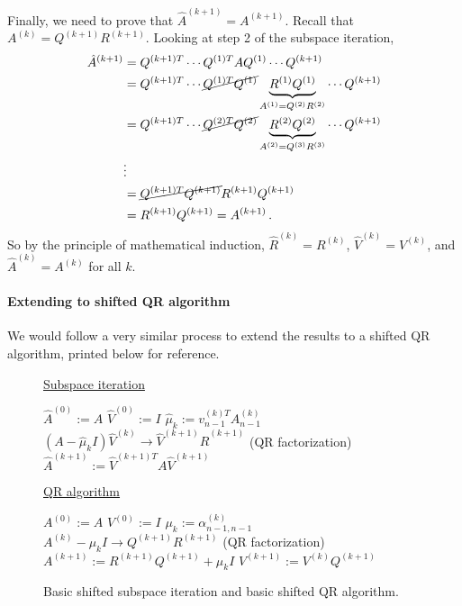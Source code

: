 \documentclass[letterpaper,10pt]{article}
\begin{document}
Finally, we need to prove that $\hat A^{(k+1)}=A^{(k+1)}$. Recall that
$A^{(k)}=Q^{(k+1)}R^{(k+1)}$. Looking at step 2 of the subspace iteration,
\begin{align*}
\hat A^{(k+1)}&=Q^{(k+1)T}\cdots Q^{(1)T}AQ^{(1)}\cdots Q^{(k+1)}\\
&=Q^{(k+1)T}\cdots \cancel{Q^{(1)T}Q^{(1)}}\underbrace{R^{(1)}Q^{(1)}}_
{A^{(1)}=Q^{(2)}R^{(2)}}
\cdots
Q^{(k+1)}\\
&=Q^{(k+1)T}\cdots \cancel{Q^{(2)T}Q^{(2)}}\underbrace{R^{(2)}Q^{(2)}}_
{A^{(2)}=Q^{(3)}R^{(3)}}
\cdots
Q^{(k+1)}\\
&\vdots \\
&=\cancel{Q^{(k+1)T}Q^{(k+1)}}R^{(k+1)}Q^{(k+1)}\\
&=R^{(k+1)}Q^{(k+1)}=A^{(k+1)}\,.
\end{align*}
So by the principle of mathematical induction, $\hat R^{(k)}=R^{(k)}$,
$\hat V^{(k)}=V^{(k)}$, and $\hat A^{(k)}=A^{(k)}$ for all $k$.

\paragraph*{Extending to shifted QR algorithm} We would follow a very similar
process to extend the results to a shifted QR algorithm, printed below for
reference.

\begin{figure}[ht]
\begin{minipage}[t]{0.5\linewidth}

\underline{Subspace iteration}
\begin{algorithmic}
\STATE $\hat A^{(0)}:=A$
\STATE $\hat V^{(0)}:=I$
\STATE $\hat\mu_k:=v_{n-1}^{(k)T}A_{n-1}^{(k)}$
\STATE $(A-\hat\mu_kI)\hat V^{(k)}\rightarrow\hat V^{(k+1)}\hat R^{(k+1)}$ (QR
factorization)
\STATE $\hat A^{(k+1)}:=\hat V^{(k+1)T}A\hat V^{(k+1)}$
\ENDFOR
\end{algorithmic}

\end{minipage}
\begin{minipage}[t]{0.5\linewidth}

\underline{QR algorithm}
\begin{algorithmic}
\STATE $A^{(0)}:=A$
\STATE $V^{(0)}:=I$
\STATE $\mu_k:=\alpha_{n-1,n-1}^{(k)}$
\STATE $A^{(k)}-\mu_kI\rightarrow Q^{(k+1)}R^{(k+1)}$ (QR factorization)
\STATE $A^{(k+1)}:=R^{(k+1)}Q^{(k+1)}+\mu_kI$
\STATE $V^{(k+1)}:=V^{(k)}Q^{(k+1)}$
\ENDFOR
\end{algorithmic}

\end{minipage}
\caption{Basic shifted subspace iteration and basic shifted QR algorithm.}
\end{figure}
\end{document}
